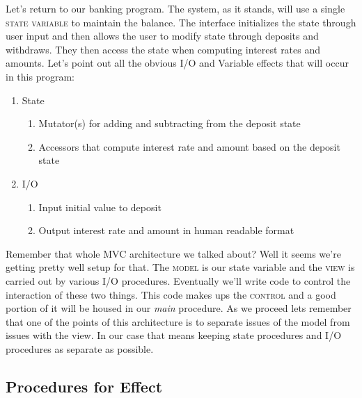 \documentclass[]{tufte-handout}
\begin{document}
Let's return to our banking program. The system, as it stands, will use a single \textsc{state variable} to maintain the balance. The interface initializes the state through user input and then allows the user to modify state through deposits and withdraws. They then access the state when computing interest rates and amounts. Let's point out all the obvious I/O and Variable effects that will occur in this program:
\begin{enumerate}
\item State
\begin{enumerate}
\item Mutator(s) for adding and subtracting from the deposit state
\item Accessors that compute interest rate and amount based on the deposit state
\end{enumerate}
\item I/O
\begin{enumerate}
\item Input initial value to deposit 
\item Output interest rate and amount in human readable format
\end{enumerate}
\end{enumerate}

Remember that whole MVC architecture we talked about? Well it seems we're getting pretty well setup for that. The \textsc{model} is our state variable and the  \textsc{view} is carried out by various I/O procedures.  Eventually we'll write code to control the interaction of these two things. This code makes ups the \textsc{control} and a good portion of it will be housed in our \textit{main} procedure. As we proceed lets remember that one of the points of this architecture is to separate issues of the model from issues with the view. In our case that means keeping state procedures and I/O procedures as separate as possible. 


\subsection{Procedures for Effect}
\end{document}
